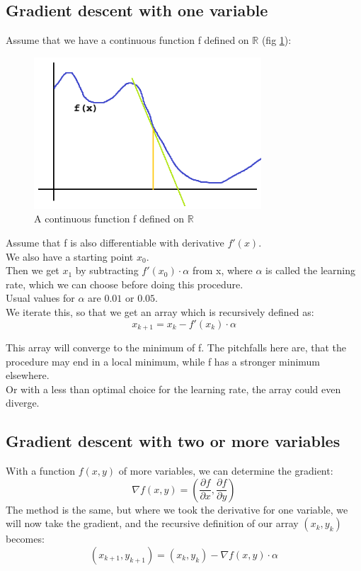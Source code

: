 \documentclass[journal]{IEEEtran}
\begin{document}
\subsection{Gradient descent with one variable}
\label{GradientDescent1}
Assume that we have a continuous function f defined on $\mathbb{R}$ (fig \ref{contfunctionR}):
\begin{figure}[H]
    \includegraphics[width=8.5cm,keepaspectratio]{images/fx_example_01.png}
    \caption{A continuous function f defined on $\mathbb{R}$ }
    \label{contfunctionR}
\end{figure}
Assume that f is also differentiable with derivative $f'(x)$.\\
We also have a starting point $x_0$.\\
Then we get $x_1$ by subtracting $f'(x_0) \cdot \alpha$ from x, where $\alpha$ is called the learning rate, which we can choose before doing this procedure.\\
Usual values for $\alpha$ are $0.01$ or $0.05$.\\
We iterate this, so that we get an array which is recursively defined as:\\
\[x_{k+1} = x_k - f'(x_k) \cdot \alpha\]

This array will converge to the minimum of f.
The pitchfalls here are, that the procedure may end in a local minimum, while f has a stronger minimum elsewhere.\\
Or with a less than optimal choice for the learning rate, the array could even diverge.

\subsection{Gradient descent with two or more variables}
\label{GradientDescent2}
With a function $f(x, y)$ of more variables, we can determine the gradient:
\[
\nabla f(x,y) = \left( \frac{\partial f}{\partial x}, \frac{\partial f}{\partial y} \right)
\]
The method is the same, but where we took the derivative for one variable, we will now take the gradient, and the recursive definition of our array  $(x_k,y_k)$ becomes:\\
\[(x_{k+1},y_{k+1}) = (x_k,y_k) - \nabla f(x,y) \cdot \alpha\]
\end{document}
